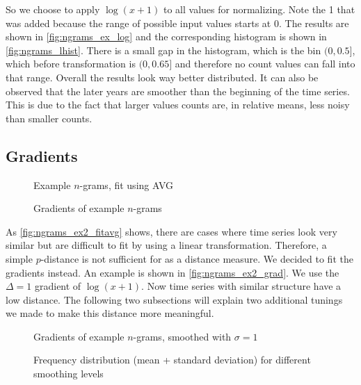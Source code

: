 So we choose to apply $\log(x + 1)$ to all values for normalizing. Note the \num{1} that was added because the range of possible input values starts at \num{0}. The results are shown in \autoref{fig:ngrams_ex_log} and the corresponding histogram is shown in \autoref{fig:ngrams_lhist}. There is a small gap in the histogram, which is the bin $(0,0.5]$, which before transformation is $(0,0.65]$ and therefore no count values can fall into that range. Overall the results look way better distributed. It can also be observed that the later years are smoother than the beginning of the time series. This is due to the fact that larger values counts are, in relative means, less noisy than smaller counts.


\subsection{Gradients}
\label{ssec:baseline:sim:grad}

\begin{figure}
    \centering
    
    \caption{Example $n$-grams, fit using AVG}\label{fig:ngrams_ex2_fitavg}
\end{figure}

\begin{figure}
    \centering
    
    \caption{Gradients of example $n$-grams}\label{fig:ngrams_ex2_grad}
\end{figure}

As \autoref{fig:ngrams_ex2_fitavg} shows, there are cases where time series look very similar but are difficult to fit by using a linear transformation. Therefore, a simple $p$-distance is not sufficient for as a distance measure. We decided to fit the gradients instead. An example is shown in \autoref{fig:ngrams_ex2_grad}. We use the $\Delta = 1$ gradient of $\log(x + 1)$. Now time series with similar structure have a low distance. The following two subsections will explain two additional tunings we made to make this distance more meaningful.

\begin{figure}
    \centering
    
    \caption{Gradients of example $n$-grams, smoothed with $\sigma = 1$}\label{fig:ngrams_ex2_grad_smooth}
\end{figure}

\begin{figure}
    \centering
    
    \caption{Frequency distribution (mean + standard deviation) for different smoothing levels}\label{fig:smoothing_frequencies}
\end{figure}

